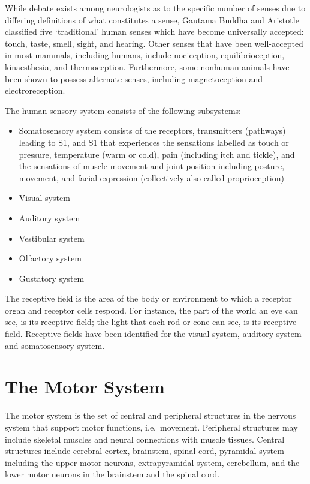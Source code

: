 While debate exists among neurologists as to the specific number of senses due to differing definitions of what constitutes a sense, Gautama Buddha and Aristotle classified five `traditional' human senses which have become universally accepted: touch, taste, smell, sight, and hearing. Other senses that have been well-accepted in most mammals, including humans, include nociception, equilibrioception, kinaesthesia, and thermoception. Furthermore, some nonhuman animals have been shown to possess alternate senses, including magnetoception and electroreception.

The human sensory system consists of the following subsystems:

\begin{itemize}
\tightlist
\item
  Somatosensory system consists of the receptors, transmitters (pathways) leading to S1, and S1 that experiences the sensations labelled as touch or pressure, temperature (warm or cold), pain (including itch and tickle), and the sensations of muscle movement and joint position including posture, movement, and facial expression (collectively also called proprioception)
\item
  Visual system
\item
  Auditory system
\item
  Vestibular system
\item
  Olfactory system
\item
  Gustatory system
\end{itemize}

The receptive field is the area of the body or environment to which a receptor organ and receptor cells respond. For instance, the part of the world an eye can see, is its receptive field; the light that each rod or cone can see, is its receptive field. Receptive fields have been identified for the visual system, auditory system and somatosensory system.

\hypertarget{the-motor-system}{%
\section{The Motor System}\label{the-motor-system}}

The motor system is the set of central and peripheral structures in the nervous system that support motor functions, i.e.~movement. Peripheral structures may include skeletal muscles and neural connections with muscle tissues. Central structures include cerebral cortex, brainstem, spinal cord, pyramidal system including the upper motor neurons, extrapyramidal system, cerebellum, and the lower motor neurons in the brainstem and the spinal cord.

